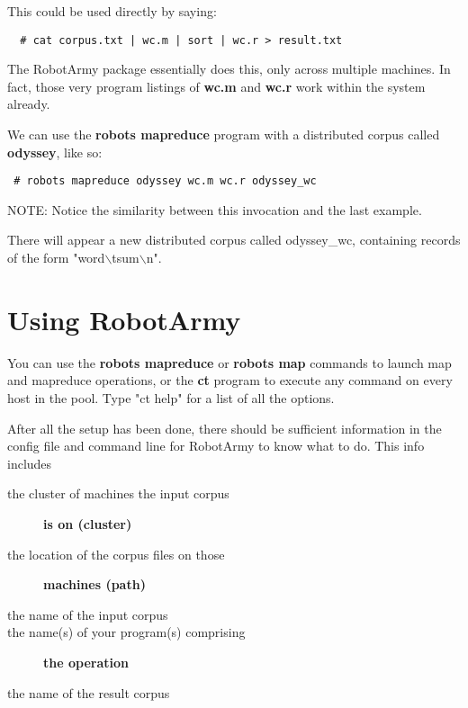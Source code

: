 \documentclass{tufte-handout}
\begin{document}
This could be used directly by saying:

\begin{verbatim}
  # cat corpus.txt | wc.m | sort | wc.r > result.txt
\end{verbatim}


The RobotArmy package essentially does this, only across multiple machines. In fact, those very program listings of \textbf{wc.m} and \textbf{wc.r} work within the system already.



We can use the \textbf{robots mapreduce} program with a distributed corpus called \textbf{odyssey}, like so:

\begin{verbatim}
 # robots mapreduce odyssey wc.m wc.r odyssey_wc
\end{verbatim}


NOTE: Notice the similarity between this invocation and the last example.



There will appear a new distributed corpus called odyssey\_wc, containing records of the form "word$\backslash$tsum$\backslash$n".

\section{Using RobotArmy\label{Using_RobotArmy}}


You can use the \textbf{robots mapreduce} or \textbf{robots map} commands to launch map and mapreduce operations, or the \textbf{ct} program to execute any command on every host in the pool. Type "ct help" for a list of all the options.



After all the setup has been done, there should be sufficient information in the config file and command line for RobotArmy to know what to do. This info includes

\begin{description}

\item[{the cluster of machines the input corpus}] \textbf{is on (\textbf{cluster})}
\item[{the location of the corpus files on those}] \textbf{machines (\textbf{path})}
\item[{the name of the input corpus}] \mbox{}
\item[{the name(s) of your program(s) comprising}] \textbf{the operation}
\item[{the name of the result corpus}] \mbox{}\end{description}
\end{document}
